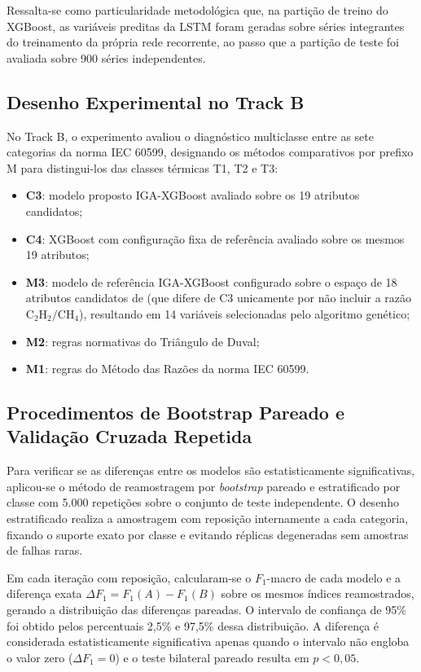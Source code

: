 Ressalta-se como particularidade metodológica que, na partição de treino do XGBoost, as variáveis preditas da LSTM foram geradas sobre séries integrantes do treinamento da própria rede recorrente, ao passo que a partição de teste foi avaliada sobre 900 séries independentes.

\subsection{Desenho Experimental no Track B}

No Track B, o experimento avaliou o diagnóstico multiclasse entre as sete categorias da norma IEC 60599, designando os métodos comparativos por prefixo M para distingui-los das classes térmicas T1, T2 e T3:
\begin{itemize}
    \item \textbf{C3}: modelo proposto IGA-XGBoost avaliado sobre os 19 atributos candidatos;
    \item \textbf{C4}: XGBoost com configuração fixa de referência avaliado sobre os mesmos 19 atributos;
    \item \textbf{M3}: modelo de referência IGA-XGBoost configurado sobre o espaço de 18 atributos candidatos de  (que difere de C3 unicamente por não incluir a razão $\text{C}_2\text{H}_2/\text{CH}_4$), resultando em 14 variáveis selecionadas pelo algoritmo genético;
    \item \textbf{M2}: regras normativas do Triângulo de Duval;
    \item \textbf{M1}: regras do Método das Razões da norma IEC 60599.
\end{itemize}

\subsection{Procedimentos de Bootstrap Pareado e Validação Cruzada Repetida}

Para verificar se as diferenças entre os modelos são estatisticamente significativas, aplicou-se o método de reamostragem por \textit{bootstrap} pareado e estratificado por classe com 5.000 repetições sobre o conjunto de teste independente. O desenho estratificado realiza a amostragem com reposição internamente a cada categoria, fixando o suporte exato por classe e evitando réplicas degeneradas sem amostras de falhas raras.

Em cada iteração com reposição, calcularam-se o $F_1$-macro de cada modelo e a diferença exata $\Delta F_1 = F_1(A) - F_1(B)$ sobre os mesmos índices reamostrados, gerando a distribuição das diferenças pareadas. O intervalo de confiança de 95\% foi obtido pelos percentuais 2,5\% e 97,5\% dessa distribuição. A diferença é considerada estatisticamente significativa apenas quando o intervalo não engloba o valor zero ($\Delta F_1 = 0$) e o teste bilateral pareado resulta em $p < 0,05$.

